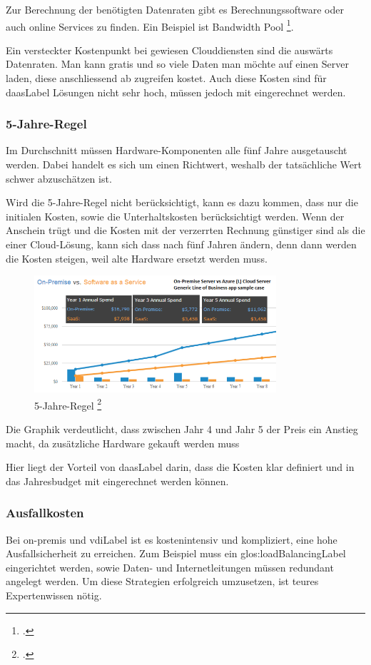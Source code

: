 Zur Berechnung der benötigten Datenraten gibt es Berechnungssoftware oder auch online Services zu finden. Ein Beispiel ist Bandwidth Pool \footcite{What_is_Bandwidth_Pool_Bandwidth_Pool}.

Ein versteckter Kostenpunkt bei gewiesen Clouddiensten sind die auswärts Datenraten. Man kann gratis und so viele Daten man möchte auf einen Server laden, diese anschliessend ab zugreifen kostet.
Auch diese Kosten sind für \Gls{daasLabel} Lösungen nicht sehr hoch, müssen jedoch mit eingerechnet werden.

\subsubsection{5-Jahre-Regel}
Im Durchschnitt müssen Hardware-Komponenten alle fünf Jahre ausgetauscht werden. Dabei handelt es sich um einen Richtwert, weshalb der tatsächliche Wert schwer abzuschätzen ist.

Wird die 5-Jahre-Regel nicht berücksichtigt, kann es dazu kommen, dass nur die initialen Kosten, sowie die Unterhaltskosten berücksichtigt werden.
Wenn der Anschein trügt und die Kosten mit der verzerrten Rechnung günstiger sind als die einer Cloud-Lösung, kann sich dass nach fünf Jahren ändern, denn dann werden die Kosten steigen, weil alte Hardware ersetzt werden muss.

\begin{figure}[H]
	\includegraphics[width=0.8\textwidth]{images/five-year-rule}
	\caption{5-Jahre-Regel \footcite{Comparing_cloud_vs_on-premise_Six_hidden_costs_people_always_forget_about}}
	\label{fig:fiveYearRuleImage}
\end{figure}
Die Graphik verdeutlicht, dass zwischen Jahr 4 und Jahr 5 der Preis ein Anstieg macht, da zusätzliche Hardware gekauft werden muss

Hier liegt der Vorteil von \Gls{daasLabel} darin, dass die Kosten klar definiert und in das Jahresbudget mit eingerechnet werden können.

\subsubsection{Ausfallkosten}
Bei on-premis und \Gls{vdiLabel} ist es kostenintensiv und kompliziert, eine hohe Ausfallsicherheit zu erreichen. Zum Beispiel muss ein \gls{glos:loadBalancingLabel} eingerichtet werden, sowie Daten- und Internetleitungen müssen redundant angelegt werden. Um diese Strategien erfolgreich umzusetzen, ist teures Expertenwissen nötig.

